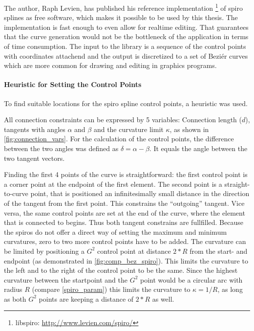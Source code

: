 

The author, Raph Levien, has published his reference implementation \footnote{libspiro: \url{http://www.levien.com/spiro/}} of spiro splines as free software, which makes it possible to be used by this thesis. The implementation is fast enough to even allow for realtime editing. That guarantees that the curve generation would not be the bottleneck of the application in terms of time consumption. The input to the library is a sequence of the control points with coordinates attachend and the output is discretized to a set of Beziér curves which are more common for drawing and editing in graphics programs.

\paragraph{Heuristic for Setting the Control Points}

To find suitable locations for the spiro spline control points, a heuristic was used.

All connection constraints can be expressed by 5 variables: Connection length ($d$), tangents with angles $\alpha$ and $\beta$ and the curvature limit $\kappa$, as shown in \autoref{fig:connection_vars}. For the calculation of the control points, the difference between the two angles was defined as $\delta = \alpha - \beta$. It equals the angle between the two tangent vectors. 

Finding the first 4 points of the curve is straightforward: the first control point is a corner point at the endpoint of the first element. The second point is a straight-to-curve point, that is positioned an infinitesimally small distance in the direction of the tangent from the first point. This constrains the \enquote{outgoing} tangent. Vice versa, the same control points are set at the end of the curve, where the element that is connected to begins. Thus both tangent constrains are fullfilled. Because the spiros do not offer a direct way of setting the maximum and minimum curvatures, zero to two more control points have to be added. The curvature can be limited by positioning a $G^2$ control point at distance $2 * R$ from the start- and endpoint (as demonstrated in \autoref{fig:comp_bez_spiro}). This limits the curvature to the left and to the right of the control point to be the same. Since the highest curvature between the startpoint and the $G^2$ point would be a circular arc with radius $R$ (compare \autoref{spiro_param}) this limits the curvature to $\kappa = 1/R$, as long as both $G^2$ points are keeping a distance of $2*R$ as well.

